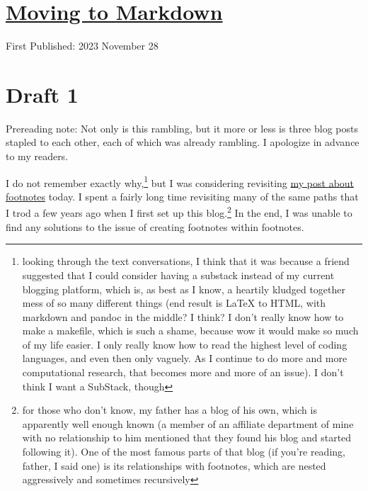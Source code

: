 \documentclass[12pt]{article}[titlepage]
\newcommand{\1}{\={a}}
\newcommand{\2}{\={e}}
\newcommand{\3}{\={\i}}
\newcommand{\4}{\=o}
\newcommand{\5}{\=u}
\newcommand{\6}{\={A}}
\renewcommand{\,}{\textsuperscript{,}}
\begin{document}
\doublespacing
\section{\href{to-markdown.html}{Moving to Markdown}}
First Published: 2023 November 28

\section{Draft 1}
Prereading note: Not only is this rambling, but it more or less is three blog posts stapled to each other, each of which was already rambling.
I apologize in advance to my readers.

I do not remember exactly why,\footnote{looking through the text conversations, I think that it was because a friend suggested that I could consider having a substack instead of my current blogging platform, which is, as best as I know, a heartily kludged together mess of so many different things (end result is LaTeX to HTML, with markdown and pandoc in the middle? I think? I don't really know how to make a makefile, which is such a shame, because wow it would make so much of my life easier. I only really know how to read the highest level of coding languages, and even then only vaguely. As I continue to do more and more computational research, that becomes more and more of an issue). I don't think I want a SubStack, though} but I was considering revisiting \href{footnote-frenzy.html}{my post about footnotes} today.
I spent a fairly long time revisiting many of the same paths that I trod a few years ago when I first set up this blog.\footnote{for those who don't know, my father has a blog of his own, which is apparently well enough known (a member of an affiliate department of mine with no relationship to him mentioned that they found his blog and started following it). One of the most famous parts of that blog (if you're reading, father, I said one) is its relationships with footnotes, which are nested aggressively and sometimes recursively}
In the end, I was unable to find any solutions to the issue of creating footnotes within footnotes.
\end{document}
